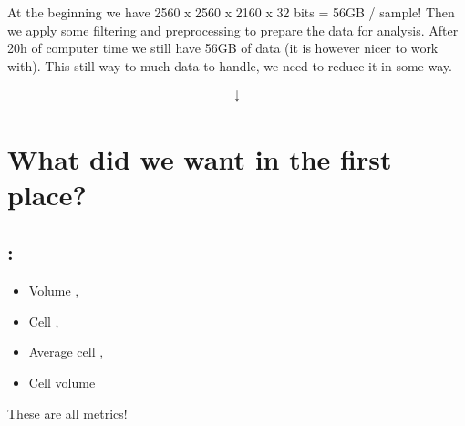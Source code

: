 \documentclass[letterpaper,10pt,english]{sphinxmanual}
\begin{document}
\sphinxAtStartPar
At the beginning we have 2560 x 2560 x 2160 x 32 bits = 56GB / sample! Then we apply some filtering and preprocessing to prepare the data for analysis. After 20h of computer time we still have 56GB of data (it is however nicer to work with). This still way to much data to handle, we need to reduce it in some way.




\begin{equation*}
\begin{split}\downarrow\end{split}
\end{equation*}






\sphinxAtStartPar
{}




\section{What did we want in the first place?}
\label{\detokenize{04-BasicSegmentation:what-did-we-want-in-the-first-place}}

\subsection{:}
\label{\detokenize{04-BasicSegmentation:single-numbers}}\begin{itemize}
\item {} 
\sphinxAtStartPar
Volume ,

\item {} 
\sphinxAtStartPar
Cell ,

\item {} 
\sphinxAtStartPar
Average cell ,

\item {} 
\sphinxAtStartPar
Cell volume 

\end{itemize}

\sphinxAtStartPar
These are all  metrics!
\end{document}
